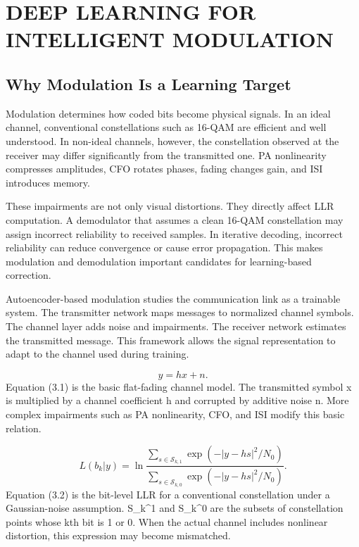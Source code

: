\chapter[\textbf{DEEP LEARNING FOR INTELLIGENT MODULATION}]{DEEP LEARNING FOR INTELLIGENT MODULATION}
\section{Why Modulation Is a Learning Target}
Modulation determines how coded bits become physical signals. In an ideal channel, conventional constellations such as 16-QAM are efficient and well understood. In non-ideal channels, however, the constellation observed at the receiver may differ significantly from the transmitted one. PA nonlinearity compresses amplitudes, CFO rotates phases, fading changes gain, and ISI introduces memory.

These impairments are not only visual distortions. They directly affect LLR computation. A demodulator that assumes a clean 16-QAM constellation may assign incorrect reliability to received samples. In iterative decoding, incorrect reliability can reduce convergence or cause error propagation. This makes modulation and demodulation important candidates for learning-based correction.

Autoencoder-based modulation studies the communication link as a trainable system. The transmitter network maps messages to normalized channel symbols. The channel layer adds noise and impairments. The receiver network estimates the transmitted message. This framework allows the signal representation to adapt to the channel used during training.

\begin{equation}
y=hx+n.
\end{equation}
Equation (3.1) is the basic flat-fading channel model. The transmitted symbol x is multiplied by a channel coefficient h and corrupted by additive noise n. More complex impairments such as PA nonlinearity, CFO, and ISI modify this basic relation.

\begin{equation}
L(b_k|y)=\ln\frac{\sum_{s\in\mathcal{S}_{k,1}}\exp(-|y-hs|^2/N_0)}
{\sum_{s\in\mathcal{S}_{k,0}}\exp(-|y-hs|^2/N_0)}.
\end{equation}
Equation (3.2) is the bit-level LLR for a conventional constellation under a Gaussian-noise assumption. S\_k\textasciicircum{}1 and S\_k\textasciicircum{}0 are the subsets of constellation points whose kth bit is 1 or 0. When the actual channel includes nonlinear distortion, this expression may become mismatched.

